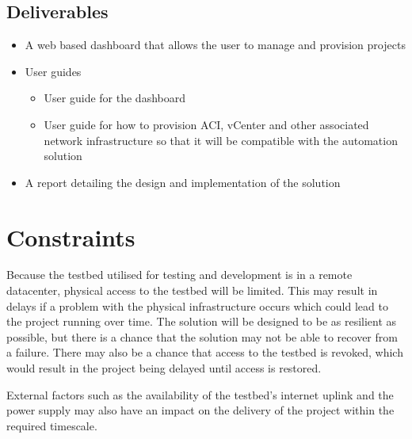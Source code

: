\subsection{Deliverables}
\label{intro:aims:deliverables}

\begin{itemize}
    \item A web based dashboard that allows the user to manage and provision projects
    \item User guides
          \begin{itemize}
              \item User guide for the dashboard
              \item User guide for how to provision ACI, vCenter and other associated network infrastructure so that it will be compatible with the automation solution
          \end{itemize}
    \item A report detailing the design and implementation of the solution
\end{itemize}

\section{Constraints}
\label{intro:constraints}

Because the testbed utilised for testing and development is in a remote datacenter, physical access to the testbed will be limited.
This may result in delays if a problem with the physical infrastructure occurs which could lead to the project running over time.
The solution will be designed to be as resilient as possible, but there is a chance that the solution may not be able to recover from a failure.
There may also be a chance that access to the testbed is revoked, which would result in the project being delayed until access is restored.

External factors such as the availability of the testbed's internet uplink and the power supply may also have an impact on the delivery of the project within the required timescale.
